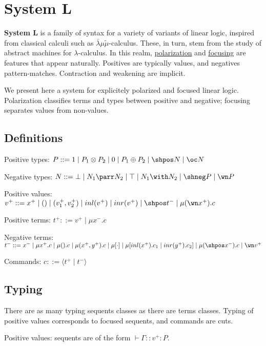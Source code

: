 \chapter{System L}\label{system-l}

\textbf{System L} is a family of syntax for a variety of variants of
linear logic, inspired from classical calculi such as
\(\bar\lambda\mu\tilde\mu\)-calculus. These, in turn, stem from the
study of abstract machines for \(\lambda\)-calculus. In this realm,
\hyperref[polarized-linear-logic]{polarization} and \hyperref[reversibility-and-focusing]{focusing} are
features that appear naturally. Positives are typically values, and
negatives pattern-matches. Contraction and weakening are implicit.

We present here a system for explicitely polarized and focused linear
logic. Polarization classifies terms and types between positive and
negative; focusing separates values from non-values.

\section{Definitions}\label{definitions}

Positive types:
\(P ::= 1 \mid P_1 \otimes P_2 \mid 0 \mid P_1 \oplus P_2 \mid \shpos N \mid \oc N\)

Negative types:
\(N ::= \bot \mid N_1 \parr N_2 \mid \top \mid N_1 \with N_2 \mid \shneg P \mid \wn P\)

Positive values:
\(v^+ ::= x^+ \mid () \mid (v_1^+, v_2^+) \mid inl(v^+) \mid inr(v^+) \mid \shpos t^- \mid \mu(\wn x^+).c\)

Positive terms: \(t^+ ::= v^+ \mid \mu x^-.c\)

Negative terms:
\(t^- ::= x^- \mid \mu x^+.c \mid \mu().c \mid \mu(x^+, y^+).c \mid \mu [\cdot] \mid \mu[inl(x^+).c_1 \mid inr(y^+).c_2] \mid \mu(\shpos x^-).c \mid \wn v^+\)

Commands: \(c ::= \langle t^+ \mid t^- \rangle\)

\section{Typing}\label{typing}

There are as many typing sequents classes as there are terms classes.
Typing of positive values corresponds to focused sequents, and
commands are cuts.

Positive values: sequents are of the form \(\vdash \Gamma :: v^+ : P\).

